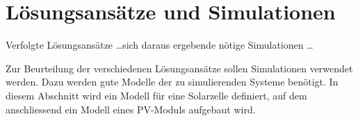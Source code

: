 \chapter{L\"osungsans\"atze und Simulationen}
\label{chap:simu}

Verfolgte L\"osungsans\"atze \ldots sich daraus ergebende n\"otige Simulationen \ldots

Zur  Beurteilung  der  verschiedenen  L\"osungsans\"atze  sollen  Simulationen
verwendet  werden. Dazu  werden  gute  Modelle der  zu  simulierenden  Systeme
ben\"otigt. In  diesem  Abschnitt  wird   ein  Modell  f\"ur  eine  Solarzelle
definiert, auf dem anschliessend ein Modell eines PV-Moduls aufgebaut wird.
